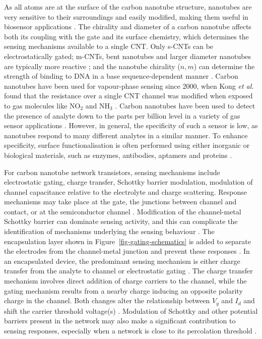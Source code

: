 \documentclass[
  a4paper,
]{scrbook}
\begin{document}
As all atoms are at the surface of the carbon nanotube structure,
nanotubes are very sensitive to their surroundings and easily modified,
making them useful in biosensor applications
\autocite{Cao2009,Yao2021,Shkodra2021}. The chirality and diameter of a
carbon nanotube affects both its coupling with the gate and its surface
chemistry, which determines the sensing mechanisms available to a single
CNT. Only s-CNTs can be electrostatically gated; m-CNTs, bent nanotubes
and larger diameter nanotubes are typically more reactive
\autocite{Cao2009,Zhao2012,Chhikara2013,Li2023}; and the nanotube
chirality (\(n,m\)) can determine the strength of binding to DNA in a
base sequence-dependent manner \autocite{Rouhi2011a}. Carbon nanotubes
have been used for vapour-phase sensing since 2000, when Kong \emph{et
al.} found that the resistance over a single CNT channel was modified
when exposed to gas molecules like NO\(_2\) and NH\(_3\)
\autocite{Kong2000}. Carbon nanotubes have been used to detect the
presence of analyte down to the parts per billion level in a variety of
gas sensor applications \autocite{Chen2019,Yao2021}. However, in
general, the specificity of such a sensor is low, as nanotubes respond
to many different analytes in a similar manner. To enhance specificity,
surface functionalisation is often performed using either inorganic or
biological materials, such as enzymes, antibodies, aptamers and proteins
\autocite{Cao2009,Shkodra2021,Yao2021}.

For carbon nanotube network transistors, sensing mechanisms include
electrostatic gating, charge transfer, Schottky barrier modulation,
modulation of channel capacitance relative to the electrolyte and charge
scattering. Response mechanisms may take place at the gate, the
junctions between channel and contact, or at the semiconductor channel
\autocite{Heller2008,Battie2011,Boyd2014,Tran2016,Li2023}. Modification
of the channel-metal Schottky barrier can dominate sensing activity, and
this can complicate the identification of mechanisms underlying the
sensing behaviour \autocite{Cao2009,Boyd2014,Schroeder2019}. The
encapsulation layer shown in Figure~\ref{fig-gating-schematics} is added
to separate the electrodes from the channel-metal junction and prevent
these responses \autocite{Heller2008,Shkodra2021}. In an encapsulated
device, the predominant sensing mechanism is either charge transfer from
the analyte to channel \autocite{Allen2007,Battie2011} or electrostatic
gating \autocite{Heller2008}. The charge transfer mechanism involves
direct addition of charge carriers to the channel, while the gating
mechanism results from a nearby charge inducing an opposite polarity
charge in the channel. Both changes alter the relationship between
\(V_g\) and \(I_d\) and shift the carrier threshold voltage(s)
\autocite{Tran2016,Shkodra2021,Li2023}. Modulation of Schottky and other
potential barriers present in the network may also make a significant
contribution to sensing responses, especially when a network is close to
its percolation threshold \autocite{Boyd2014,Murugathas2019}.
\end{document}
